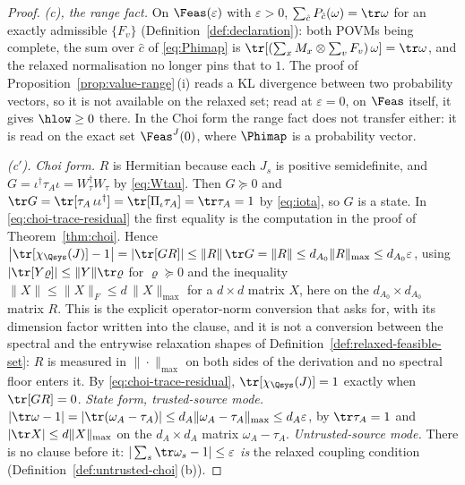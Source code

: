 \begin{proof}
\emph{(c), the range fact.} On $\Feas(\varepsilon)$ with $\varepsilon>0$,
$\sum_{\hat c}P_{\hat c}(\omega)=\tr\omega$ for an exactly admissible
$\{F_v\}$ (Definition~\ref{def:declaration}): both POVMs being complete,
the sum over $\hat c$ of \eqref{eq:Phimap} is
$\tr[(\sum_xM_x\otimes\sum_vF_v)\,\omega]=\tr\omega$, and the relaxed
normalisation no longer pins that to $1$. The proof of
Proposition~\ref{prop:value-range}\,(i) reads a KL divergence between two
probability vectors, so it is not available on the relaxed set; read at
$\varepsilon=0$, on $\Feas$ itself, it gives $\hlow\ge0$ there. In the
Choi form the range fact does not transfer either: it is read on the exact
set $\Feas^{J}(0)$, where $\Phimap$ is a probability vector.

\emph{(c$'$).} \emph{Choi form.} $R$ is Hermitian because each $J_s$ is
positive semidefinite, and $G=\iota^{\dagger}\tau_A\iota
=W_{\tau}^{\dagger}W_{\tau}$ by \eqref{eq:Wtau}. Then $G\succeq0$ and
$\tr G=\tr[\tau_A\,\iota\iota^{\dagger}]=\tr[\Pi_{\iota}\tau_A]
=\tr\tau_A=1$ by \eqref{eq:iota}, so $G$ is a state. In
\eqref{eq:choi-trace-residual} the first equality is the computation in
the proof of Theorem~\ref{thm:choi}. Hence
$\big|\tr[\chi_{\Qsys}(J)]-1\big|=|\tr[GR]|\le\|R\|\,\tr G=\|R\|
\le d_{A_0}\|R\|_{\max}\le d_{A_0}\varepsilon$, using
$|\tr[Y\varrho]|\le\|Y\|\tr\varrho$ for $\varrho\succeq0$ and the
inequality $\|X\|\le\|X\|_F\le d\,\|X\|_{\max}$ for a $d\times d$
matrix $X$, here on the $d_{A_0}\times d_{A_0}$ matrix $R$. This is the
explicit operator-norm conversion that
 asks for, with its dimension factor
written into the clause, and it is not
a conversion between the spectral and the entrywise relaxation shapes of
Definition~\ref{def:relaxed-feasible-set}: $R$ is measured in
$\|\cdot\|_{\max}$ on both sides of the derivation and no spectral floor
enters it. By \eqref{eq:choi-trace-residual}, $\tr[\chi_{\Qsys}(J)]=1$
exactly when $\tr[GR]=0$. \emph{State form, trusted-source mode.}
$|\tr\omega-1|=|\tr(\omega_A-\tau_A)|\le d_A\|\omega_A-\tau_A\|_{\max}
\le d_A\varepsilon$, by $\tr\tau_A=1$ and $|\tr X|\le d\|X\|_{\max}$ on
the $d_A\times d_A$ matrix $\omega_A-\tau_A$. \emph{Untrusted-source
mode.} There is no clause before it:
$|\sum_s\tr\omega_s-1|\le\varepsilon$ \emph{is} the relaxed coupling
condition (Definition~\ref{def:untrusted-choi}\,(b)).


\end{proof}
